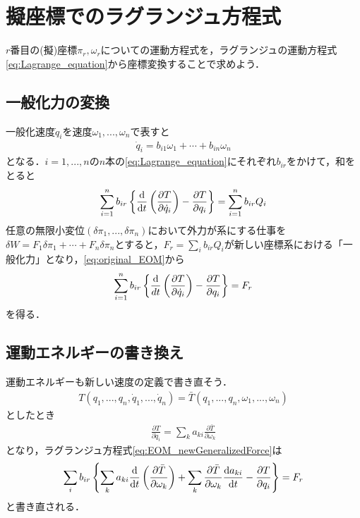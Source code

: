 \documentclass[a4j,10pt]{jsarticle}
\newcommand{\bbn}[2]{\frac{{\rm {\rm d}} #1}{{\rm {\rm d}} #2}}
\newcommand{\henbbn}[2]{\frac{\partial #1}{\partial #2}}
\begin{document}
\section{擬座標でのラグランジュ方程式}

$r$番目の(擬)座標$\pi_r, \omega_r$についての運動方程式を，ラグランジュの運動方程式\eqref{eq:Lagrange_equation}から座標変換することで求めよう．

\subsection*{一般化力の変換}

一般化速度$\dot{q}_i$を速度$\omega_1,...,\omega_n$で表すと
\begin{align}
    \dot{q}_i=b_{i1}\omega_1+\cdots+b_{in}\omega_n
\end{align}
となる．$i=1,...,n$の$n$本の\eqref{eq:Lagrange_equation}にそれぞれ$b_{ir}$をかけて，和をとると
\begin{align}
    \sum_{i=1}^n b_{ir}\left\lbrace \bbn{}{t}\left(\henbbn{T}{\dot{q}_i}\right)-\henbbn{T}{q_i}\right\rbrace = \sum_{i=1}^n b_{ir}Q_i
    \label{eq:original_EOM}
\end{align}
任意の無限小変位$(\delta \pi_1,...,\delta \pi_n)$において外力が系にする仕事を$\delta W = F_1\delta \pi_1+\cdots+F_n\delta \pi_n$とすると，$F_r=\sum_{i} b_{ir}Q_i$が新しい座標系における「一般化力」となり，\eqref{eq:original_EOM}から
\begin{align}
    \sum_{i=1}^n b_{ir}\left\lbrace \frac{{\rm d}}{dt}\left(\frac{\partial T}{\partial \dot{q}_i}\right)-\frac{\partial T}{\partial q_i}\right\rbrace = F_r
    \label{eq:EOM_newGeneralizedForce}
\end{align}
を得る．

\subsection*{運動エネルギーの書き換え}

運動エネルギーも新しい速度の定義で書き直そう．
\begin{align*}
    T(q_1,...,q_n,\dot{q}_1,...,\dot{q}_n)=\bar{T}(q_1,...,q_n,\omega_1,...,\omega_n)
\end{align*}
としたとき
\begin{align*}
    \frac{\partial T}{\partial \dot{q}_i}=\sum_{k} a_{k i}\frac{\partial \bar{T}}{\partial \omega_k}
\end{align*}
となり，ラグランジュ方程式\eqref{eq:EOM_newGeneralizedForce}は
\begin{align}
    \sum_{i} b_{ir}\left\lbrace \sum_{k} a_{k i}\bbn{}{t}\left(\frac{\partial \bar{T}}{\partial \omega_k }\right)+ \sum_{k }\frac{\partial \bar{T}}{\partial \omega_k }\bbn{a_{k i}}{t} -\frac{\partial T}{\partial q_i}\right\rbrace = F_r
    \label{eq:EOM_newKineticEnergy}
\end{align}
と書き直される．
\end{document}
